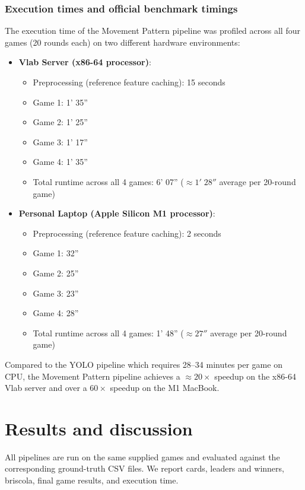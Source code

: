 \documentclass[11pt,a4paper]{article}
\begin{document}
\subsubsection{Execution times and official benchmark timings}
The execution time of the Movement Pattern pipeline was profiled across all four
games (20 rounds each) on two different hardware environments:
\begin{itemize}
    \item \textbf{Vlab Server (x86-64 processor)}:
    \begin{itemize}
        \item Preprocessing (reference feature caching): 15 seconds
        \item Game 1: 1' 35''
        \item Game 2: 1' 25''
        \item Game 3: 1' 17''
        \item Game 4: 1' 35''
        \item Total runtime across all 4 games: 6' 07'' ($\approx 1'\;28''$ average per 20-round game)
    \end{itemize}
    \item \textbf{Personal Laptop (Apple Silicon M1 processor)}:
    \begin{itemize}
        \item Preprocessing (reference feature caching): 2 seconds
        \item Game 1: 32''
        \item Game 2: 25''
        \item Game 3: 23''
        \item Game 4: 28''
        \item Total runtime across all 4 games: 1' 48'' ($\approx 27''$ average per 20-round game)
    \end{itemize}
\end{itemize}
Compared to the YOLO pipeline which requires 28--34 minutes per game on CPU,
the Movement Pattern pipeline achieves a $\approx 20\times$ speedup on the x86-64
Vlab server and over a $60\times$ speedup on the M1 MacBook.

\section{Results and discussion}

All pipelines are run on the same supplied games and evaluated against the
corresponding ground-truth CSV files. We report cards, leaders and winners,
briscola, final game results, and execution time.
\end{document}
